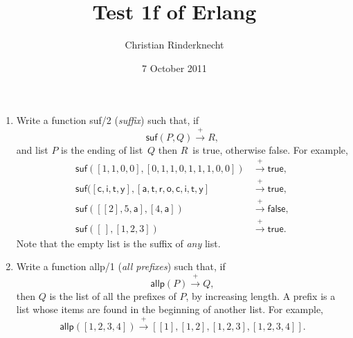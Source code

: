 \documentclass[11pt,a4paper]{article}
\title{Test 1f of \textsf{Erlang}}
\author{Christian Rinderknecht}
\date{7 October 2011}
\newcommand\fun[1]{\textsf{#1}}
\begin{document}
\maketitle

\thispagestyle{empty}


\begin{enumerate}

  \item Write a function \fun{suf/2} (\emph{suffix}) such that, if
    \[\fun{suf}(P,Q) \xrightarrow{+} R,\]
    and list \(P\) is the ending of list~\(Q\) then \(R\)~is
    \fun{true}, otherwise \fun{false}. For example,
    \begin{align*}
      \fun{suf}([1,1,0,0],[0,1,1,0,1,1,1,0,0])
      &\xrightarrow{+} \fun{true},\\
      \fun{suf}([\fun{c},\fun{i},\fun{t},\fun{y}],
      [\fun{a}, \fun{t}, \fun{r}, \fun{o}, \fun{c}, \fun{i}, \fun{t},
        \fun{y}]
      & \xrightarrow{+} \fun{true},\\
      \fun{suf}([[2],5,\fun{a}],[4,\fun{a}])
      &\xrightarrow{+} \fun{false},\\
      \fun{suf}([\,],[1,2,3])
      &\xrightarrow{+} \fun{true}.
    \end{align*}
    Note that the empty list is the suffix of \emph{any} list.

  \item Write a function \fun{allp/1} (\emph{all prefixes}) such that,
    if
    \[\fun{allp}(P) \xrightarrow{+} Q,\] then \(Q\) is the list of all
    the prefixes of \(P\), by increasing length. A prefix is a list
    whose items are found in the beginning of another list. For
    example,
    \[\fun{allp}([1,2,3,4]) \xrightarrow{+}
          [[1],[1,2],[1,2,3],[1,2,3,4]].\]

\end{enumerate}
\end{document}
